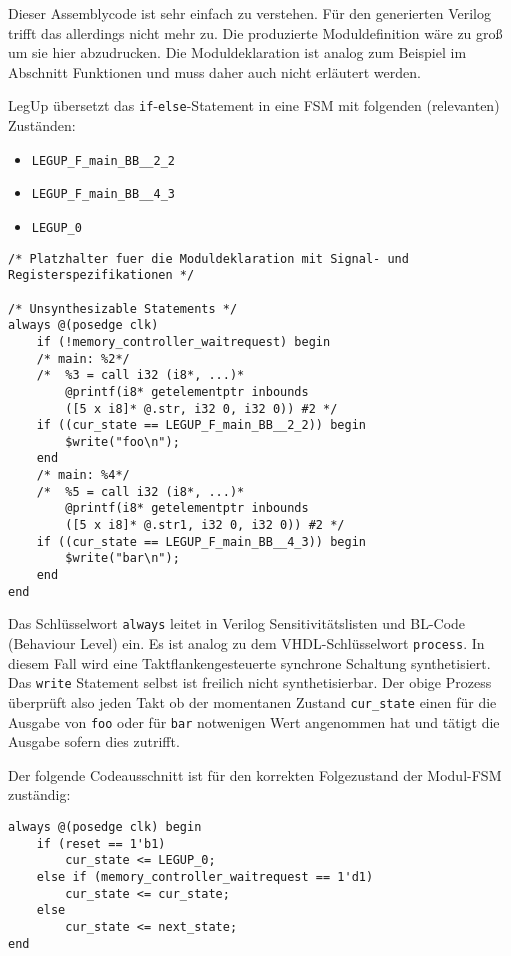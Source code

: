 \documentclass[oneside,a4paper]{article}
\def\V#1{\lstinline[style=verilog]{#1}}
\def\VH#1{\lstinline[style=vhdl]{#1}}
\def\C#1{\lstinline[style=c]{#1}}
\begin{document}
Dieser Assemblycode ist sehr einfach zu verstehen. Für den
generierten Verilog trifft das allerdings nicht mehr zu. Die
produzierte Moduldefinition wäre zu groß um sie hier abzudrucken.
Die Moduldeklaration ist analog zum Beispiel im Abschnitt Funktionen
und muss daher auch nicht erläutert werden.

LegUp übersetzt das \C{if}-\C{else}-Statement in eine FSM mit folgenden
(relevanten) Zuständen:

\begin{itemize}
    \item \V{LEGUP_F_main_BB__2_2}
    \item \V{LEGUP_F_main_BB__4_3}
    \item \V{LEGUP_0}
\end{itemize}

\begin{lstlisting}[style=verilog]
/* Platzhalter fuer die Moduldeklaration mit Signal- und Registerspezifikationen */

/* Unsynthesizable Statements */
always @(posedge clk)
    if (!memory_controller_waitrequest) begin
    /* main: %2*/
    /*  %3 = call i32 (i8*, ...)*
        @printf(i8* getelementptr inbounds
        ([5 x i8]* @.str, i32 0, i32 0)) #2 */
    if ((cur_state == LEGUP_F_main_BB__2_2)) begin
        $write("foo\n");
    end
    /* main: %4*/
    /*  %5 = call i32 (i8*, ...)*
        @printf(i8* getelementptr inbounds
        ([5 x i8]* @.str1, i32 0, i32 0)) #2 */
    if ((cur_state == LEGUP_F_main_BB__4_3)) begin
        $write("bar\n");
    end
end
\end{lstlisting}

Das Schlüsselwort \V{always} leitet in Verilog
Sensitivitätslisten und BL-Code (Behaviour Level) ein.
Es ist analog zu dem VHDL-Schlüsselwort \VH{process}.
In diesem Fall wird eine Taktflankengesteuerte synchrone
Schaltung synthetisiert. Das \V{write} Statement selbst ist freilich nicht synthetisierbar.
Der obige Prozess überprüft also jeden Takt ob der momentanen Zustand \V{cur_state}
einen für die Ausgabe von \C{foo} oder für \C{bar} notwenigen Wert
angenommen hat und tätigt die Ausgabe sofern dies zutrifft.

Der folgende Codeausschnitt ist für den korrekten Folgezustand der Modul-FSM zuständig:
\begin{lstlisting}[style=verilog]
always @(posedge clk) begin
    if (reset == 1'b1)
        cur_state <= LEGUP_0;
    else if (memory_controller_waitrequest == 1'd1)
        cur_state <= cur_state;
    else
        cur_state <= next_state;
end
\end{lstlisting}
\end{document}
